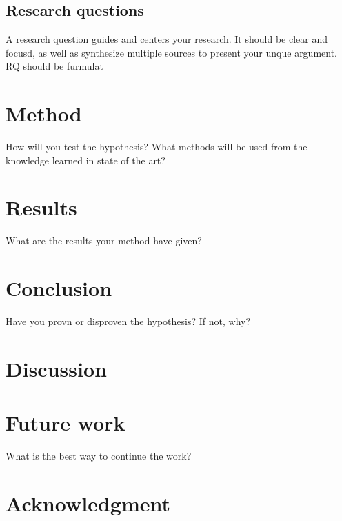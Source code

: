 \documentclass[conference]{IEEEtran}
\begin{document}
\subsection{Research questions}
A research question guides and centers your research. It should be clear and focusd, as well as synthesize multiple sources to present your unque argument. RQ should be furmulat%

\section{Method}
How will you test the hypothesis? What methods will be used from the knowledge learned in state of the art?
\section{Results}
What are the results your method have given?
\section{Conclusion}
Have you provn or disproven the hypothesis? If not, why?
\section{Discussion}

\section{Future work}
What is the best way to continue the work?


\section*{Acknowledgment}






\end{document}
